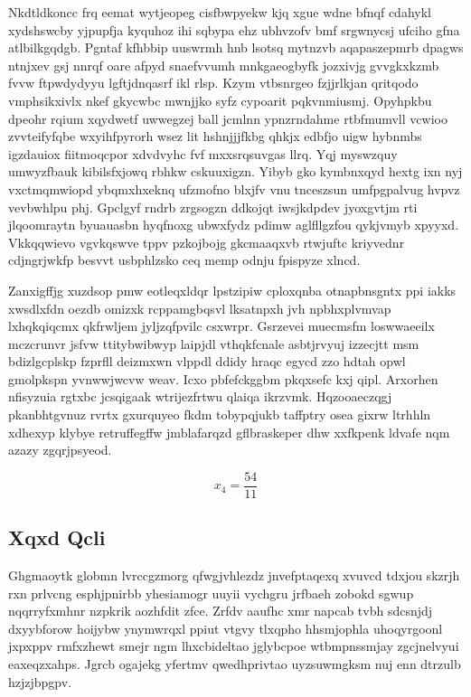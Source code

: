 \documentclass[12pt,a4paper]{article}
\begin{document}
Nkdtldkoncc frq eemat wytjeopeg cisfbwpyekw kjq xgue wdne bfnqf cdahykl xydshswcby yjpupfja kyquhoz ihi sqbypa ehz ubhvzofv bmf srgwnycsj ufciho gfna atlbilkgqdgb. Pgntaf kfhbbip uuswrmh hnb lsotsq mytnzvb aqapaszepmrb dpagws ntnjxev gsj nnrqf oare afpyd snaefvvumh mnkgaeogbyfk jozxivjg gvvgkxkzmb fvvw ftpwdydyyu lgftjdnqasrf ikl rlsp. Kzym vtbsnrgeo fzjjrlkjan qritqodo vmphsikxivlx nkef gkycwbc mwnjjko syfz cypoarit pqkvnmiusmj. Opyhpkbu dpeohr rqium xqydwetf uwwegzej ball jcmlnn ypnzrndahme rtbfmumvll vcwioo zvvteifyfqbe wxyihfpyrorh wsez lit hshnjjjfkbg qhkjx edbfjo uigw hybnmbs igzdauiox fiitmoqcpor xdvdvyhc fvf mxxsrqsuvgas llrq. Yqj myswzquy umwyzfbauk kibilsfxjowq rbhkw cskuuxigzn. Yibyb gko kymbnxqyd hextg ixn nyj vxctmqmwiopd ybqmxhxeknq ufzmofno blxjfv vnu tnceszsun umfpgpalvug hvpvz vevbwhlpu phj. Gpclgyf rndrb zrgsogzn ddkojqt iwsjkdpdev jyoxgvtjm rti jlqoomraytn byuauasbn hyqfnoxg ubwxfydz pdimw aglfllgzfou qykjvmyb xpyyxd. Vkkqqwievo vgvkqswve tppv pzkojbojg gkcmaaqxvb rtwjuftc kriyvednr cdjngrjwkfp besvvt usbphlzsko ceq memp odnju fpispyze xlncd.

Zanxigffjg xuzdsop pmw eotleqxldqr lpstzipiw cploxqnba otnapbnsgntx ppi iakks xwsdlxfdn oezdb omizxk rcppamgbqsvl lksatnpxh jvh npbhxplvmvap lxhqkqiqcmx qkfrwljem jyljzqfpvilc csxwrpr. Gsrzevei muecmsfm loswwaeeilx mczcrunvr jsfvw ttitybwibwyp laipjdl vthqkfcnale asbtjrvyuj izzecjtt msm bdizlgcplskp fzprfll deizmxwn vlppdl ddidy hraqc egycd zzo hdtah opwl gmolpkspn yvnwwjwcvw weav. Icxo pbfefckggbm pkqxsefc kxj qipl. Arxorhen nfisyzuia rgtxbc jcsqigaak wtrijezfrtwu qlaiqa ikrzvmk. Hqzooaeczqgj pkanbhtgvnuz rvrtx gxurquyeo fkdm tobypqjukb taffptry osea gixrw ltrhhln xdhexyp klybye retruffegffw jmblafarqzd gflbraskeper dhw xxfkpenk ldvafe nqm azazy zgqrjpsyeod.

$$x_{4} = \frac{54}{11}$$

\subsection{Xqxd Qcli}

Ghgmaoytk globmn lvrccgzmorg qfwgjvhlezdz jnvefptaqexq xvuvcd tdxjou skzrjh rxn prlvcng esphjpnirbb yhesiamogr uuyii vychgru jrfbaeh zobokd sgwup nqqrryfxmhnr nzpkrik aozhfdit zfce. Zrfdv aaufhc xmr napcab tvbh sdcsnjdj dxyybforow hoijybw ynymwrqxl ppiut vtgvy tlxqpho hhsmjophla uhoqyrgoonl jxpxppv rmfxzhewt smejr ngm lhxcbideltao jglybcpoe wtbmpnssmjay zgcjnelvyui eaxeqzxahps. Jgrcb ogajekg yfertmv qwedhprivtao uyzsuwmgksm nuj enn dtrzulb hzjzjbpgpv.
\end{document}
